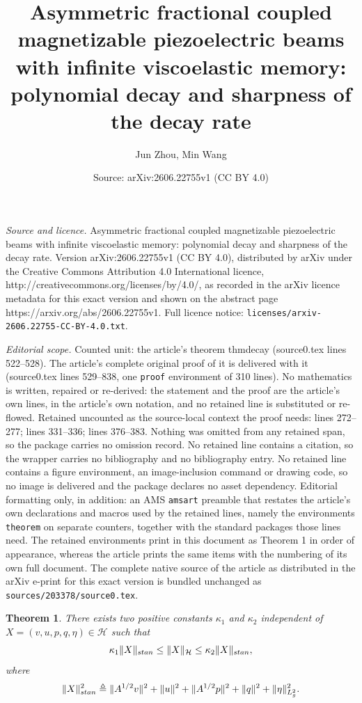 \documentclass[10pt,a4paper]{amsart}
\title{Asymmetric fractional coupled magnetizable piezoelectric beams with infinite viscoelastic memory: polynomial decay and sharpness of the decay rate}
\author{Jun Zhou, Min Wang}
\date{Source: arXiv:2606.22755v1 (CC BY 4.0)}
\newtheorem{theorem}{Theorem}
\begin{document}
\maketitle

\noindent\emph{Source and licence.} Asymmetric fractional coupled magnetizable piezoelectric beams with infinite viscoelastic memory: polynomial decay and sharpness of the decay rate. Version arXiv:2606.22755v1 (CC BY 4.0), distributed by arXiv under the Creative Commons Attribution 4.0 International licence, http://creativecommons.org/licenses/by/4.0/, as recorded in the arXiv licence metadata for this exact version and shown on the abstract page https://arxiv.org/abs/2606.22755v1. Full licence notice: \texttt{licenses/arxiv-2606.22755-CC-BY-4.0.txt}.\par\smallskip

\noindent\textit{Editorial scope.} Counted unit: the article's theorem thmdecay (source0.tex lines 522--528). The article's complete original proof of it is delivered with it (source0.tex lines 529--838, one \texttt{proof} environment of 310 lines). No mathematics is written, repaired or re-derived: the statement and the proof are the article's own lines, in the article's own notation, and no retained line is substituted or re-flowed.  Retained uncounted as the source-local context the proof needs: lines 272--277; lines 331--336; lines 376--383.  Nothing was omitted from any retained span, so the package carries no omission record.  No retained line contains a citation, so the wrapper carries no bibliography and no bibliography entry.  No retained line contains a figure environment, an image-inclusion command or drawing code, so no image is delivered and the package declares no asset dependency.  Editorial formatting only, in addition: an AMS \texttt{amsart} preamble that restates the article's own declarations and macros used by the retained lines, namely the environments \texttt{theorem} on separate counters, together with the standard packages those lines need.  The retained environments print in this document as Theorem 1 in order of appearance, whereas the article prints the same items with the numbering of its own full document.  The complete native source of the article as distributed in the arXiv e-print for this exact version is bundled unchanged as \texttt{sources/203378/source0.tex}.
	\begin{theorem}\label{thmequinorm}
		There exists two positive constants $\kappa_1$ and $\kappa_2$ independent of $X=(v,u,p,q,\eta)\in\mathcal{H}$ such that
		$$\kappa_1\|X\|_{\rm stan}\le \|X\|_{\mathcal{H}}\le\kappa_2\|X\|_{\rm stan},$$
		where
		$$\|X\|_{\rm stan}^2\triangleq\|A^{1/2}v\|^2+\|u\|^2+\|A^{1/2}p\|^2+\|q\|^2+\|\eta\|_{L^2_g}^2.$$
	\end{theorem}
\end{document}
